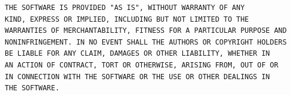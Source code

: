 \documentclass[mingoth,a4paper]{jsarticle}
\begin{document}
{{{{{{\begin{multicols}{2}
\begin{fontsize}{6}{6}
\begin{verbatim}
THE SOFTWARE IS PROVIDED "AS IS", WITHOUT WARRANTY OF ANY
KIND, EXPRESS OR IMPLIED, INCLUDING BUT NOT LIMITED TO THE
WARRANTIES OF MERCHANTABILITY, FITNESS FOR A PARTICULAR PURPOSE AND
NONINFRINGEMENT. IN NO EVENT SHALL THE AUTHORS OR COPYRIGHT HOLDERS
BE LIABLE FOR ANY CLAIM, DAMAGES OR OTHER LIABILITY, WHETHER IN
AN ACTION OF CONTRACT, TORT OR OTHERWISE, ARISING FROM, OUT OF OR
IN CONNECTION WITH THE SOFTWARE OR THE USE OR OTHER DEALINGS IN
THE SOFTWARE.
 \end{verbatim}
 \end{fontsize}
\end{multicols}


}}}}}}
\end{document}
